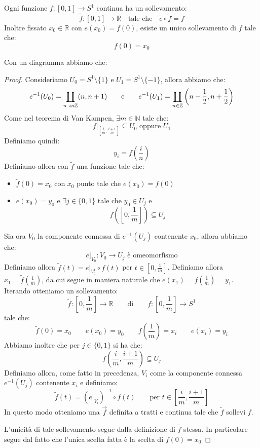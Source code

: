 \documentclass[11pt,a4paper,twoside]{article}
\theoremstyle{definition}
\begin{document}
\begin{prop}{}{}
	Ogni funzione $f:[0,1] \to S^1$ continua ha un sollevamento:
	\[ \tilde f:[0,1] \to \mathbb R \quad \text{tale che} \quad e\circ \tilde f = f \]
	Inoltre fissato $x_0 \in \mathbb R$ con $e(x_0) = f(0)$, esiste un unico sollevamento di $f$ tale che:
	\[ f(0) = x_0 \]
\end{prop}

Con un diagramma abbiamo che:
\begin{center}
\end{center}

\begin{proof}
	Consideriamo $U_0 = S^1 \setminus \{1\}$ e $U_1 = S^1 \setminus \{-1\}$, allora abbiamo che:
	\[ e^{-1}(U_0) = \coprod_{n\ in \mathbb Z}(n,n+1)\qquad \text e \qquad e^{-1}(U_1) = \coprod_{n \in \mathbb Z}\left(n-\frac 12, n+\frac 12\right) \]
	Come nel teorema di Van Kampen, $\exists m \in \mathbb N$ tale che:
	\[f|_{\left[\frac im, \frac{i+1}m\right]} \subseteq U_0 \text{ oppure }U_1\]
	Definiamo quindi:
	\[ y_i = f\left( \frac in \right) \]
	Definiamo allora con $\tilde f$ una funzione tale che:
	\begin{itemize}
		\item $\tilde f(0) = x_0$ con $x_0$ punto tale che $e(x_0) = f(0)$
		\item $e(x_0) = y_0$ e $\exists j \in \{0,1\}$ tale che $y_0 \in U_j$ e
			\[ f\left(\left[ 0, \frac 1m \right]\right) \subseteq U_j\]
	\end{itemize}
	Sia ora $V_0$ la componente connessa di $e^{-1}(U_j)$ contenente $x_0$, allora abbiamo che:
	\[ e|_{V_0}:V_0 \to U_j \text{ è omeomorfismo} \]
	Definiamo allora $\tilde f(t) = e|_{V_0^1} \circ f(t)$ per $t \in [0, \frac 1m]$. Definiamo allora $x_1 = \tilde f(\frac 1m)$, da cui segue in maniera naturale che $e(x_1) = f(\frac 1m) = y_1$.\\
	Iterando otteniamo un sollevamento:
	\[ \tilde f:\left[ 0, \frac 1m \right] \to \mathbb R \qquad \text{di}\qquad f:\left[ 0, \frac 1m \right] \to S^1 \]
	tale che:
	\[ \tilde f(0) = x_0\qquad e(x_0) = y_0 \qquad f\left(\frac 1m\right)=x_i \qquad e(x_i) = y_i \]
	Abbiamo inoltre che per $j \in \{0,1\}$ si ha che:
	\[ f\left( \frac im, \frac{i+1}m \right)\subseteq U_j \]
	Definiamo allora, come fatto in precedenza, $V_i$ come la componente connessa $e^{-1}(U_j)$ contenente $x_i$ e definiamo:
	\[ \tilde f(t)= \left(e|_{V_i}\right)^{-1} \circ f(t)\qquad \text{per }t \in \left[\frac im, \frac{i+1}m\right] \]
	In questo modo otteniamo una $\vec f$ definita a tratti e continua tale che $\tilde f$ sollevi $f$.

	L'unicità di tale sollevamento segue dalla definizione di $\tilde f$ stessa. In particolare segue dal fatto che l'unica scelta fatta è la scelta di $f(0)=x_0$
\end{proof}
\end{document}
